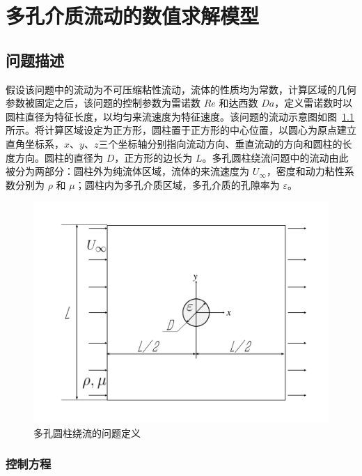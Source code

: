 \chapter{多孔介质流动的数值求解模型}\label{chap: numerical model}

\section{问题描述}\label{sec: problem description}

假设该问题中的流动为不可压缩粘性流动，流体的性质均为常数，计算区域的几何参数被固定之后，该问题的控制参数为雷诺数 $Re$ 和达西数 $Da$，定义雷诺数时以圆柱直径为特征长度，以均匀来流速度为特征速度。该问题的流动示意图如图~\ref{fig: cylinder} 所示。将计算区域设定为正方形，圆柱置于正方形的中心位置，以圆心为原点建立直角坐标系，$x$、$y$、$z$三个坐标轴分别指向流动方向、垂直流动的方向和圆柱的长度方向。圆柱的直径为 $D$，正方形的边长为 $L$。多孔圆柱绕流问题中的流动由此被分为两部分：圆柱外为纯流体区域，流体的来流速度为 $U_\infty$，密度和动力粘性系数分别为 $\rho$ 和 $\mu$；圆柱内为多孔介质区域，多孔介质的孔隙率为 $\varepsilon$。

\begin{figure}
	\centering
	\includegraphics[scale=.6]{figs/cylinder}
	\caption{多孔圆柱绕流的问题定义}\label{fig: cylinder}
\end{figure}

\subsection{控制方程}

